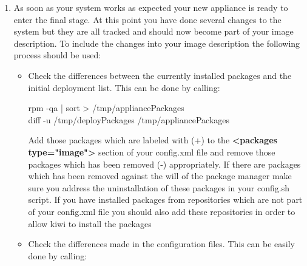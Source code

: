 \begin{enumerate}
\begin{itemize}
            \begin{Command}{10cm}
            rpm -qa | sort > /tmp/deployPackages
            \end{Command}

      \item Check the output of the command \textbf{git status} and
            include everything which is unknown to git and surely
            will not be changed by you and will not become part of the
            image description overlay files to the \textit{/.gitignore}
            files
      \end{itemize}

      After the initial package list exists and the git repository is
      clean you can start to configure the system. You never should
      install additional software just by installing an unmanaged archive
      or build and install from source. It's very hard to find out
      what binary files had been installed and it's also not architecture
      safe. If there is really no other way for the software to become
      part of the image you should address this issue directly in your
      image description and the config.sh script but not after the initial
      deployment has happened.
\item As soon as your system works as expected your new appliance is
      ready to enter the final stage. At this point you have done several
      changes to the system but they are all tracked and should now become
      part of your image description. To include the changes into your
      image description the following process should be used:
      \begin{itemize}
      \item Check the differences between the currently installed packages
            and the initial deployment list. This can be done by calling:

            \begin{Command}{12cm}
            rpm -qa | sort > /tmp/appliancePackages\\
            diff -u /tmp/deployPackages /tmp/appliancePackages
            \end{Command}

            Add those packages which are labeled with (+) to the
            \textbf{<packages type="image">} section of your config.xml
            file and remove those packages which has been removed (-)
            appropriately. If there are packages which has been removed
            against the will of the package manager make sure you address
            the uninstallation of these packages in your config.sh
            script. If you have installed packages from repositories which
            are not part of your config.xml file you should also add these
            repositories in order to allow kiwi to install the packages
      \item Check the differences made in the configuration files. This
            can be easily done by calling:


\end{itemize}
\end{enumerate}
